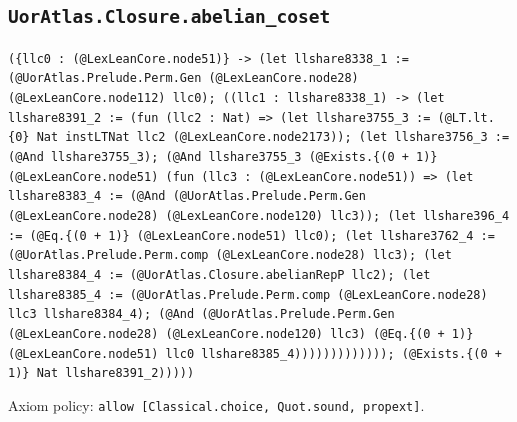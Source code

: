 \documentclass[11pt]{article}
\begin{document}
\subsection*{\texttt{UorAtlas.Closure.abelian\_coset}}
\noindent\texttt{(\{llc0 : (@LexLeanCore.node51)\} -> (let llshare8338\_1 := (@UorAtlas.Prelude.Perm.Gen (@LexLeanCore.node28) (@LexLeanCore.node112) llc0); ((llc1 : llshare8338\_1) -> (let llshare8391\_2 := (fun (llc2 : Nat) => (let llshare3755\_3 := (@LT.lt.\{0\} Nat instLTNat llc2 (@LexLeanCore.node2173)); (let llshare3756\_3 := (@And llshare3755\_3); (@And llshare3755\_3 (@Exists.\{(0 + 1)\} (@LexLeanCore.node51) (fun (llc3 : (@LexLeanCore.node51)) => (let llshare8383\_4 := (@And (@UorAtlas.Prelude.Perm.Gen (@LexLeanCore.node28) (@LexLeanCore.node120) llc3)); (let llshare396\_4 := (@Eq.\{(0 + 1)\} (@LexLeanCore.node51) llc0); (let llshare3762\_4 := (@UorAtlas.Prelude.Perm.comp (@LexLeanCore.node28) llc3); (let llshare8384\_4 := (@UorAtlas.Closure.abelianRepP llc2); (let llshare8385\_4 := (@UorAtlas.Prelude.Perm.comp (@LexLeanCore.node28) llc3 llshare8384\_4); (@And (@UorAtlas.Prelude.Perm.Gen (@LexLeanCore.node28) (@LexLeanCore.node120) llc3) (@Eq.\{(0 + 1)\} (@LexLeanCore.node51) llc0 llshare8385\_4))))))))))))); (@Exists.\{(0 + 1)\} Nat llshare8391\_2)))))}\par
\noindent Axiom policy: \texttt{allow [Classical.choice, Quot.sound, propext]}.\par
\end{document}
